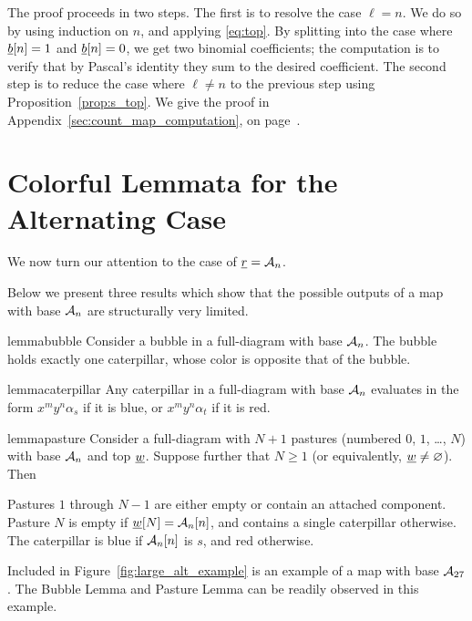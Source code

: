 The proof proceeds in two steps.  The first is to resolve the case $\ell = n$.  We do so by using induction on $n$, and applying \eqref{eq:top}.  By splitting into the case where $\ul b[n] = 1$ and $\ul b[n] = 0$, we get two binomial coefficients; the computation is to verify that by Pascal's identity they sum to the desired coefficient.
The second step is to reduce the case where $\ell \neq n$ to the previous step using Proposition~\ref{prop:s_top}.  We give the proof in Appendix~\ref{sec:count_map_computation}, on page~\pageref{sec:count_map_computation}.

\section{Colorful Lemmata for the Alternating Case}
\label{sec:res_alt_restrict}
We now turn our attention to the case of $\ul r = \AA_n$.

Below we present three results which show that the possible outputs of a map with base $\AA_n$ are structurally very limited.
\begin{restatable}{lemma}{bubble}
	Consider a bubble in a full-diagram with base $\AA_n$.  The bubble holds exactly one caterpillar, whose color is opposite that of the bubble.
	\label{thm:bubble}
\end{restatable}
\begin{restatable}{lemma}{caterpillar}
	Any caterpillar in a full-diagram with base $\AA_n$ evaluates in the form $x^my^n\alpha_s$ if it is blue, or $x^my^n\alpha_t$ if it is red.
	\label{thm:caterpillar}
\end{restatable}
\begin{restatable}{lemma}{pasture}
	Consider a full-diagram with $N+1$ pastures (numbered $0$, $1$, \dots, $N$) with base $\AA_n$ and top $\ul w$.  Suppose further that $N \ge 1$ (or equivalently, $\ul w \neq \varnothing$).  Then
	\begin{enumerate}[(i)]
		\ii Pastures $1$ through $N-1$ are either empty or contain an attached component.
		\ii Pasture $N$ is empty if $\ul w[N] = \AA_n[n]$, and contains a single caterpillar otherwise.  The caterpillar is blue if $\AA_n[n]$ is $s$, and red otherwise.
	\end{enumerate}
	\label{thm:pasture}
\end{restatable}

Included in Figure~\ref{fig:large_alt_example} is an example of a map with base $\AA_{27}$.   The Bubble Lemma and Pasture Lemma can be readily observed in this example.

